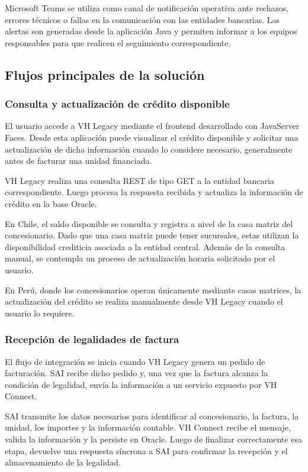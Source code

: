 Microsoft Teams se utiliza como canal de notificación operativa ante rechazos, errores técnicos o fallas en la comunicación con las entidades bancarias. Las alertas son generadas desde la aplicación Java y permiten informar a los equipos responsables para que realicen el seguimiento correspondiente.

\subsection{Flujos principales de la solución}

\subsubsection{Consulta y actualización de crédito disponible}

El usuario accede a VH Legacy mediante el frontend desarrollado con JavaServer Faces. Desde esta aplicación puede visualizar el crédito disponible y solicitar una actualización de dicha información cuando lo considere necesario, generalmente antes de facturar una unidad financiada.

VH Legacy realiza una consulta REST de tipo GET a la entidad bancaria correspondiente. Luego procesa la respuesta recibida y actualiza la información de crédito en la base Oracle.

En Chile, el saldo disponible se consulta y registra a nivel de la casa matriz del concesionario. Dado que una casa matriz puede tener sucursales, estas utilizan la disponibilidad crediticia asociada a la entidad central. Además de la consulta manual, se contempla un proceso de actualización horaria solicitado por el usuario.

En Perú, donde los concesionarios operan únicamente mediante casas matrices, la actualización del crédito se realiza manualmente desde VH Legacy cuando el usuario lo requiere.

\subsubsection{Recepción de legalidades de factura}

El flujo de integración se inicia cuando VH Legacy genera un pedido de facturación. SAI recibe dicho pedido y, una vez que la factura alcanza la condición de legalidad, envía la información a un servicio expuesto por VH Connect.

SAI transmite los datos necesarios para identificar al concesionario, la factura, la unidad, los importes y la información contable. VH Connect recibe el mensaje, valida la información y la persiste en Oracle. Luego de finalizar correctamente esa etapa, devuelve una respuesta síncrona a SAI para confirmar la recepción y el almacenamiento de la legalidad.

